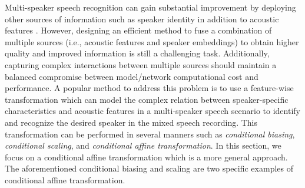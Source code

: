\documentclass{article}
\begin{document}
Multi-speaker speech recognition can gain substantial improvement by deploying other sources of information such as speaker identity in addition to acoustic features \cite{denisov2019end, wang2019end}. However, designing an efficient method to fuse a combination of multiple sources (i.e., acoustic features and speaker embeddings) to obtain higher quality and improved information is still a challenging task. Additionally, capturing complex interactions between multiple sources should maintain a balanced compromise between model/network computational cost and performance. A popular method to address this problem is to use a feature-wise transformation \cite{perez2018film} which can model the complex relation between speaker-specific characteristics and acoustic features in a multi-speaker speech scenario to identify and recognize the desired speaker in the mixed speech recording. This transformation can be performed in several manners such as \emph{conditional biasing}, \emph{conditional scaling}, and \emph{conditional affine transformation}. In this section, we focus on a conditional affine transformation  which is a more general approach. The aforementioned conditional biasing and scaling are two specific examples of conditional affine transformation. 
\end{document}
